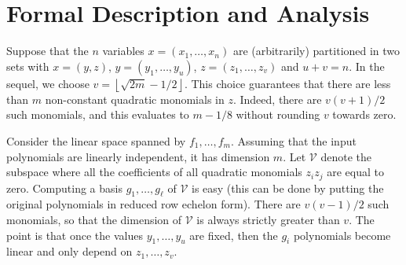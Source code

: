 \documentclass[a4paper]{article}
\begin{document}
\section{Formal Description and Analysis}







Suppose that the $n$ variables $x = (x_1, \dots, x_n)$ are (arbitrarily)
partitioned in two sets with $x = (y, z)$, $y = (y_1, \dots, y_{u})$,
$z = (z_1, \dots, z_{v})$ and $u + v = n$. In the sequel, we choose
$v = \left\lfloor \sqrt{2m} - 1/2 \right\rfloor$. This choice guarantees that
there are less than $m$ non-constant quadratic monomials in $z$. Indeed, there
are $v(v+1)/2$ such monomials, and this evaluates to $m - 1/8$ without
rounding $v$ towards zero.


Consider the linear space spanned by $f_1, \dots, f_m$. Assuming that the input
polynomials are linearly independent, it has dimension $m$.  Let $\mathcal{V}$
denote the subspace where all the coefficients of all quadratic monomials
$z_i z_j$ are equal to zero. Computing a basis $g_1, \dots, g_\ell$ of
$\mathcal{V}$ is easy (this can be done by putting the original polynomials in
reduced row echelon form). There are $v(v-1) / 2$ such monomials, so that the
dimension of $\mathcal{V}$ is always strictly greater than $v$. The point is
that once the values $y_1, \dots, y_u$ are fixed, then the $g_i$ polynomials
become linear and only depend on $z_1, \dots, z_v$.
\end{document}
